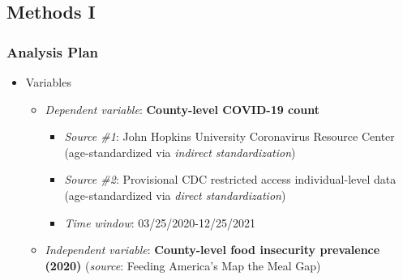 \documentclass{beamer}
\begin{document}
 \subsection{Methods I}
\begin{frame}
	\frametitle{Analysis Plan}
\begin{itemize}
	\item Variables
	\begin{itemize}
		\item \textit{Dependent variable}: \textbf{County-level COVID-19 count}
		\begin{itemize}
			\item \textit{Source \#1}: John Hopkins University Coronavirus Resource Center (age-standardized via \textit{indirect standardization})
			\item \textit{Source \#2}: Provisional CDC restricted access individual-level data (age-standardized via \textit{direct standardization})
			\item \textit{Time window}: 03/25/2020-12/25/2021
		\end{itemize}
		\vspace{0.2cm}
		\item \textit{Independent variable}: \textbf{County-level food insecurity prevalence (2020)} (\textit{source}: Feeding America's Map the Meal Gap)
		\vspace{0.2cm}
		\vspace{0.2cm}
	\end{itemize}
\end{itemize}
\end{frame}
\end{document}
